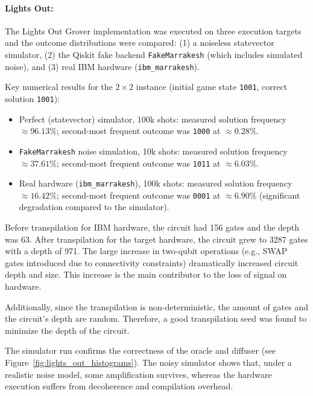 \paragraph{Lights Out:}
The Lights Out Grover implementation was executed on three execution targets and the outcome distributions were compared: (1) a noiseless statevector simulator, (2) the Qiskit fake backend \texttt{FakeMarrakesh} (which includes simulated noise), and (3) real IBM hardware (\texttt{ibm\_marrakesh}).

\vspace{1em}
\noindent Key numerical results for the $2\times 2$ instance (initial game state \texttt{1001}, correct solution \texttt{1001}):
\begin{itemize}
	\item Perfect (statevector) simulator, 100k shots: measured solution frequency $\approx 96.13\%$; second-most frequent outcome was \texttt{1000} at $\approx 0.28\%$.
	\item \texttt{FakeMarrakesh} noise simulation, 10k shots: measured solution frequency $\approx 37.61\%$; second-most frequent outcome was \texttt{1011} at $\approx 6.03\%$.
	\item Real hardware (\texttt{ibm\_marrakesh}), 100k shots: measured solution frequency $\approx 16.42\%$; second-most frequent outcome was \texttt{0001} at $\approx 6.90\%$ (significant degradation compared to the simulator).
\end{itemize}

\noindent
Before transpilation for IBM hardware, the circuit had 156 gates and the depth was 63. After transpilation for the target hardware, the circuit grew to 3287 gates with a depth of 971. The large increase in two-qubit operations (e.g., SWAP gates introduced due to connectivity constraints) dramatically increased circuit depth and size. This increase is the main contributor to the loss of signal on hardware.

\noindent
Additionally, since the transpilation is non-deterministic, the amount of gates and the circuit's depth are random. Therefore, a good transpilation seed was found to minimize the depth of the circuit.

\vspace{1em}
\noindent
The simulator run confirms the correctness of the oracle and diffuser (see Figure~\ref{fig:lights_out_histograms}). The noisy simulator shows that, under a realistic noise model, some amplification survives, whereas the hardware execution suffers from decoherence and compilation overhead.

